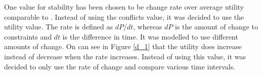 One value for stability has been chosen to be change rate over average utility comparable to \cite{Mailler2014}. Instead of using the conflicts value, it was decided to use the utility value. The rate is defined as \(dP/dt\), whereas \(dP\) is the amount of change to constraints and \(dt\) is the difference in time. It was modelled to use different amounts of change. On can see in Figure \ref{d_1} that the utility does increase instead of decrease when the rate increases. Instead of using this value, it was decided to only use the rate of change and compare various time intervals.

%


